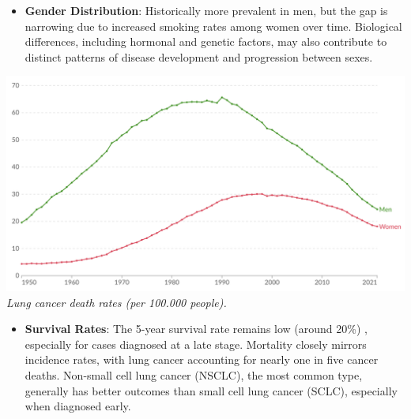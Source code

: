 \begin{itemize}
    \item \textbf{Gender Distribution}: Historically more prevalent in men, but the gap is narrowing 
    due to increased smoking rates among women over time. Biological differences, including hormonal 
    and genetic factors, may also contribute to distinct patterns of disease development and 
    progression between sexes.
\end{itemize}

\vspace{1em}
\begin{center}
    \includegraphics[width=1.00\textwidth]{assets/01-overview/lc-death-men-vs-women.png}
    \small\textit{Lung cancer death rates (per 100.000 people). \cite{ourworldindata, who2024}}
\end{center}
\vspace{1em}

\begin{itemize}
    \item \textbf{Survival Rates}: The 5-year survival rate remains low (around 20\%) 
    \cite{nlm2025}, especially for cases diagnosed at a late stage. Mortality closely mirrors 
    incidence rates, with lung cancer accounting for nearly one in five cancer deaths. Non-small 
    cell lung cancer (NSCLC), the most common type, generally has better outcomes than small cell 
    lung cancer (SCLC), especially when diagnosed early.
\end{itemize}

